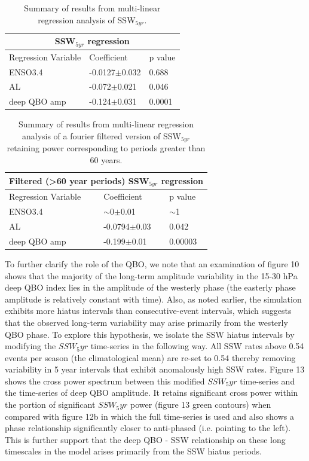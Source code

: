 \documentclass[wcd, manuscript]{copernicus}
\begin{document}
\begin{table}
\centering
\begin{tabular}{|p{3cm}||p{3cm}|p{3cm}|}
 \hline
 \multicolumn{3}{|c|}{SSW$_{5yr}$ regression}\\
 \hline
 Regression Variable& Coefficient& p value\\
 \hline
 ENSO3.4  & -0.0127$\pm$0.032& 0.688\\
 AL  &   -0.072$\pm$0.021  & 0.046\\
 deep QBO amp &-0.124$\pm$0.031&0.0001\\
 \hline
\end{tabular}
\begin{center}
\caption{Summary of results from multi-linear regression analysis of SSW$_{5yr}$.} 
\end{center}
\end{table}

\begin{table}
\centering
\begin{tabular}{|p{3cm}||p{3cm}|p{3cm}|}
 \hline
 \multicolumn{3}{|c|}{Filtered (>60 year periods) SSW$_{5yr}$ regression}\\
 \hline
 Regression Variable& Coefficient& p value\\
 \hline
 ENSO3.4  &   $\sim$0$\pm$0.01  & $\sim$1\\
 AL & -0.0794$\pm$0.03& 0.042\\
 deep QBO amp &-0.199$\pm$0.01&0.00003\\
 \hline
\end{tabular}
\begin{center}
\caption{Summary of results from multi-linear regression analysis of a fourier filtered  version of SSW$_{5yr}$ retaining power corresponding to periods greater than 60 years.}  
\end{center}
\end{table}


To further clarify the role of the QBO, we note that an examination of figure 10 shows that the majority of the long-term amplitude variability in the 15-30 hPa deep QBO index lies in the amplitude of the westerly phase (the easterly phase amplitude is relatively constant with time). Also, as noted earlier, the simulation exhibits more hiatus intervals than consecutive-event intervals, which suggests that the observed long-term variability may arise primarily from the westerly QBO phase. To explore this hypothesis, we isolate the SSW  hiatus intervals by modifying the $SSW_5yr$ time-series in the following way. All SSW rates above 0.54 events per season (the climatological mean) are re-set to 0.54 thereby removing variability in 5 year intervals that exhibit anomalously high SSW rates. Figure 13 shows the cross power spectrum between this modified $SSW_5yr$ time-series and the time-series of deep QBO amplitude. It retains significant cross power within the portion of significant $SSW_5yr$ power (figure 13 green contours) when compared with figure 12b in which the full time-series is used and also shows a phase relationship significantly closer to anti-phased (i.e. pointing to the left). This is further support that the deep QBO - SSW relationship  on these long timescales in the model arises primarily from the SSW hiatus periods. 
\end{document}
